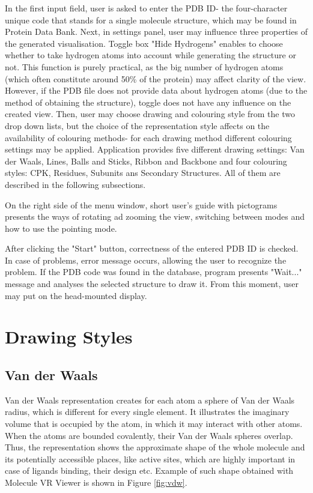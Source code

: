 In the first input field, user is asked to enter the PDB ID- the four-character unique code that stands for a single molecule structure, which may be found in Protein Data Bank. Next, in settings panel, user may influence three properties of the generated visualisation. Toggle box "Hide Hydrogens" enables to choose whether to take hydrogen atoms into account while generating the structure or not. This function is purely practical, as the big number of hydrogen atoms (which often constitute around 50\% of the protein) may affect clarity of the view. However, if the PDB file does not provide data about hydrogen atoms (due to the method of obtaining the structure), toggle does not have any influence on the created view. Then, user may choose drawing and colouring style from the two drop down lists, but the choice of the representation style affects on the availability of colouring methods- for each drawing method different colouring settings may be applied. Application provides five different drawing settings: Van der Waals, Lines, Balls and Sticks, Ribbon and Backbone and four colouring styles: CPK, Residues, Subunits ans Secondary Structures. All of them are described in the following subsections.

On the right side of the menu window, short user's guide with pictograms presents the ways of rotating ad zooming the view, switching between modes and how to use the pointing mode.   

After clicking the "Start" button, correctness of the entered PDB ID is checked. In case of problems, error message occurs, allowing the user to recognize the problem. If the PDB code was found in the database, program presents "Wait..." message and analyses the selected structure to draw it. From this moment, user may put on the head-mounted display.
   
\section{Drawing Styles} %

\subsection{Van der Waals}

Van der Waals representation creates for each atom a sphere of Van der Waals radius, which is different for every single element. It illustrates the imaginary volume that is occupied by the atom, in which it may interact with other atoms. When the atoms are bounded covalently, their Van der Waals spheres overlap. Thus, the representation shows the approximate shape of the whole molecule and its potentially accessible places, like active sites, which are highly important in case of ligands binding, their design etc. Example of such shape obtained with Molecule VR Viewer is shown in Figure \ref{fig:vdw}.

